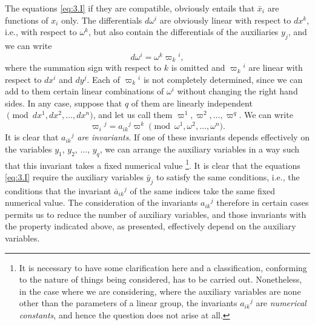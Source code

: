 \documentclass[leqno,11pt]{article}
\theoremstyle{shape1}
\theoremstyle{shape0}
\theoremstyle{shape2}
\theoremstyle{definition}
\newcommand{\vp}{\varpi}
\begin{document}
The equations \eqref{eq:3.I} if they are compatible, obviously entails that $\bar x_{i}$ are functions of $x_{i}$ only. The differentials $d\omega^{i}$ are obviously linear with respect to $dx^{k}$, i.e., with respect to $\omega^{k}$, but also contain the differentials of the auxiliaries $y_{j}$, and we can write
\[
d\omega^{i}=\omega^{k}\varpi_{k}{}^{i},
\]
where the summation sign with respect to $k$ is omitted and $\varpi_{k}{}^{i}$ are linear with respect to $dx^{i}$ and $dy^{j}$. Each of $\varpi_{k}{}^{i}$ is not completely determined, since we can add to them certain linear combinations of $\omega^{i}$ without changing the right hand sides. In any case, suppose that $q$ of them are linearly independent$\pmod{dx^{1},dx^{2},\dots,dx^{n}}$, and let us call them $\varpi^{1},\varpi^{2},\dots,\vp^{q}$. We can write
\[
\vp_{i}{}^{j}=a_{ik}{}^{j}\vp^{k}\pmod{\omega^{1},\omega^{2},\dots,\omega^{n}}.
\]
It is clear that $a_{ik}{}^{j}$ \emph{are invariants}. If one of these invariants depends effectively on the variables $y_{1}$, $y_{2}$, $\dots$, $y_{q}$, we can arrange the auxiliary variables in a way such that this invariant takes a fixed numerical value \footnote{It is necessary to have some clarification here and a classification, conforming to the nature of things being considered, has to be carried out. Nonetheless, in the case where we are considering, where the auxiliary variables are none other than the parameters of a linear group, the invariants $a_{ik}{}^{j}$ are \emph{numerical constants}, and hence the question does not arise at all.}. It is clear that the equations \eqref{eq:3.I} require the auxiliary variables $\bar y_{j}$ to satisfy the same conditions, i.e., the conditions that the invariant $\bar a_{ik}{}^{j}$ of the same indices take the same fixed numerical value. The consideration of the invariants $a_{ik}{}^{j}$ therefore in certain cases permits us to reduce the number of auxiliary variables, and those invariants with the property indicated above, as presented, effectively depend on the auxiliary variables.
\end{document}
